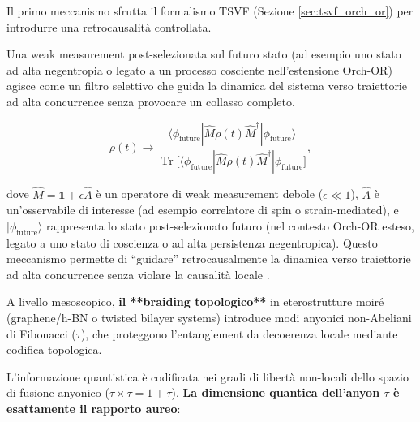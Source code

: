 \documentclass[11pt,a4paper]{article}
\let\oldcite\cite
\renewcommand{\cite}{\protect\oldcite}
\let\oldref\ref
\renewcommand{\ref}{\protect\oldref}
\theoremstyle{plain}
\theoremstyle{definition}
\begin{document}
\vspace{0.2cm}

Il primo meccanismo sfrutta il formalismo TSVF (Sezione \ref{sec:tsvf_orch_or}) per introdurre una retrocausalità controllata. 

\vspace{0.2cm}

Una weak measurement post-selezionata sul futuro stato (ad esempio uno stato ad alta negentropia o legato a un processo cosciente nell’estensione Orch-OR) agisce come un filtro selettivo che guida la dinamica del sistema verso traiettorie ad alta concurrence senza provocare un collasso completo.



\vspace{0.3cm}

\begin{tcolorbox}[colback=blue!3!white, colframe=blue!80!black, title={Weak measurement post-selezionata secondo il Two-State Vector Formalism (TSVF)}]
\begin{equation}
\rho(t) \to \frac{\langle \phi_{\text{future}} | \hat{M} \rho(t) \hat{M}^\dagger | \phi_{\text{future}} \rangle}{\operatorname{Tr}\bigl[\langle \phi_{\text{future}} | \hat{M} \rho(t) \hat{M}^\dagger | \phi_{\text{future}} \bigr]},
\label{eq:post_selected_weak}
\end{equation}

dove $\hat{M} = \mathbb{1} + \epsilon \hat{A}$ è un operatore di weak measurement debole ($\epsilon \ll 1$), $\hat{A}$ è un'osservabile di interesse (ad esempio correlatore di spin o strain-mediated), e $|\phi_{\text{future}}\rangle$ rappresenta lo stato post-selezionato futuro (nel contesto Orch-OR esteso, legato a uno stato di coscienza o ad alta persistenza negentropica). Questo meccanismo permette di “guidare” retrocausalmente la dinamica verso traiettorie ad alta concurrence senza violare la causalità locale \cite{Aharonov2008}.
\end{tcolorbox}


\vspace{0.3cm}

A livello mesoscopico, \textbf{il **braiding topologico**} in eterostrutture moiré (graphene/h-BN o twisted bilayer systems) introduce modi anyonici non-Abeliani di Fibonacci ($\tau$), che proteggono l’entanglement da decoerenza locale mediante codifica topologica. 


\vspace{0.2cm}


L'informazione quantistica è codificata nei gradi di libertà non-locali dello spazio di fusione anyonico ($\tau \times \tau = 1 + \tau$). \textbf{La dimensione quantica dell'anyon $\tau$ è esattamente il rapporto aureo}:
\end{document}
